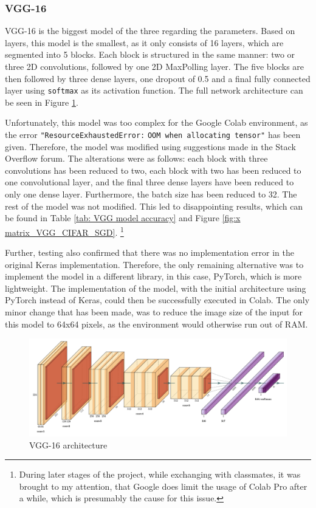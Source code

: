 \documentclass[conference]{IEEEtran}
\begin{document}
\subsubsection{VGG-16}
VGG-16 is the biggest model of the three regarding the parameters. 
Based on layers, this model is the smallest, as it only consists of 16 layers, which are segmented into 5 blocks. 
Each block is structured in the same manner: two or three 2D convolutions, followed by one 2D MaxPolling layer. 
The five blocks are then followed by three dense layers, one dropout of 0.5 and a final fully connected layer using \verb|softmax| as its activation function. 
The full network architecture can be seen in Figure \ref{fig:x VGG architecture}. \cite{simonyan_very_2015}

Unfortunately, this model was too complex for the Google Colab environment, as the error \verb|"ResourceExhaustedError:| \verb|OOM when allocating tensor"| has been given. 
Therefore, the model was modified using suggestions made in the Stack Overflow forum. \cite{gervais_answer_2019}
The alterations were as follows: each block with three convolutions has been reduced to two, each block with two has been reduced to one convolutional layer, and the final three dense layers have been reduced to only one dense layer. Furthermore, the batch size has been reduced to 32. 
The rest of the model was not modified. This led to disappointing results, which can be found in Table \ref{tab: VGG model accuracy} and Figure \ref{fig:x matrix_VGG_CIFAR_SGD}. \footnote{During later stages of the project, while exchanging with classmates, it was brought to my attention, that Google does limit the usage of Colab Pro after a while, which is presumably the cause for this issue. }

Further, testing also confirmed that there was no implementation error in the original Keras implementation. 
Therefore, the only remaining alternative was to implement the model in a different library, in this case, PyTorch, which is more lightweight.
The implementation of the model, with the initial architecture using PyTorch instead of Keras,  could then be successfully executed in Colab. 
The only minor change that has been made, was to reduce the image size of the input for this model to 64x64 pixels, as the environment would otherwise run out of RAM.

\begin{figure}[!htbp]
    \centering
    \includegraphics[scale=0.07]{img/VGG.png}
    \caption{VGG-16 architecture \cite{noauthor_forks_nodate}}
    \label{fig:x VGG architecture}
\end{figure}
\end{document}
